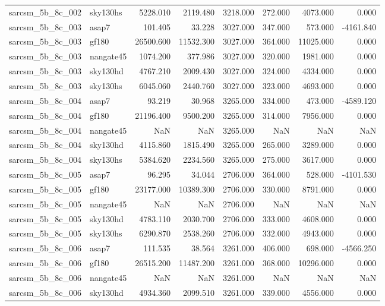 \begin{tabular}{llrrrrrr}
sarcsm\_5b\_8c\_002 & sky130hs & 5228.010 & 2119.480 & 3218.000 & 272.000 & 4073.000 & 0.000 \\
sarcsm\_5b\_8c\_003 & asap7 & 101.405 & 33.228 & 3027.000 & 347.000 & 573.000 & -4161.840 \\
sarcsm\_5b\_8c\_003 & gf180 & 26500.600 & 11532.300 & 3027.000 & 364.000 & 11025.000 & 0.000 \\
sarcsm\_5b\_8c\_003 & nangate45 & 1074.200 & 377.986 & 3027.000 & 320.000 & 1981.000 & 0.000 \\
sarcsm\_5b\_8c\_003 & sky130hd & 4767.210 & 2009.430 & 3027.000 & 324.000 & 4334.000 & 0.000 \\
sarcsm\_5b\_8c\_003 & sky130hs & 6045.060 & 2440.760 & 3027.000 & 323.000 & 4693.000 & 0.000 \\
sarcsm\_5b\_8c\_004 & asap7 & 93.219 & 30.968 & 3265.000 & 334.000 & 473.000 & -4589.120 \\
sarcsm\_5b\_8c\_004 & gf180 & 21196.400 & 9500.200 & 3265.000 & 314.000 & 7956.000 & 0.000 \\
sarcsm\_5b\_8c\_004 & nangate45 & NaN & NaN & 3265.000 & NaN & NaN & NaN \\
sarcsm\_5b\_8c\_004 & sky130hd & 4115.860 & 1815.490 & 3265.000 & 265.000 & 3289.000 & 0.000 \\
sarcsm\_5b\_8c\_004 & sky130hs & 5384.620 & 2234.560 & 3265.000 & 275.000 & 3617.000 & 0.000 \\
sarcsm\_5b\_8c\_005 & asap7 & 96.295 & 34.044 & 2706.000 & 364.000 & 528.000 & -4101.530 \\
sarcsm\_5b\_8c\_005 & gf180 & 23177.000 & 10389.300 & 2706.000 & 330.000 & 8791.000 & 0.000 \\
sarcsm\_5b\_8c\_005 & nangate45 & NaN & NaN & 2706.000 & NaN & NaN & NaN \\
sarcsm\_5b\_8c\_005 & sky130hd & 4783.110 & 2030.700 & 2706.000 & 333.000 & 4608.000 & 0.000 \\
sarcsm\_5b\_8c\_005 & sky130hs & 6290.870 & 2538.260 & 2706.000 & 332.000 & 4943.000 & 0.000 \\
sarcsm\_5b\_8c\_006 & asap7 & 111.535 & 38.564 & 3261.000 & 406.000 & 698.000 & -4566.250 \\
sarcsm\_5b\_8c\_006 & gf180 & 26515.200 & 11487.200 & 3261.000 & 368.000 & 10296.000 & 0.000 \\
sarcsm\_5b\_8c\_006 & nangate45 & NaN & NaN & 3261.000 & NaN & NaN & NaN \\
sarcsm\_5b\_8c\_006 & sky130hd & 4934.360 & 2099.510 & 3261.000 & 339.000 & 4556.000 & 0.000 \\

\end{tabular}
